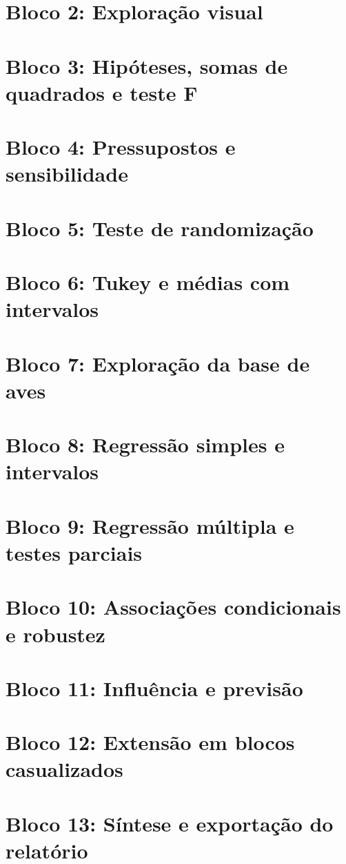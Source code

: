 \section{Bloco 2: Exploração visual}
\label{cod:bloco2}
\section{Bloco 3: Hipóteses, somas de quadrados e teste F}
\label{cod:bloco3}
\section{Bloco 4: Pressupostos e sensibilidade}
\label{cod:bloco4}
\section{Bloco 5: Teste de randomização}
\label{cod:bloco5}
\section{Bloco 6: Tukey e médias com intervalos}
\label{cod:bloco6}
\section{Bloco 7: Exploração da base de aves}
\label{cod:bloco7}
\section{Bloco 8: Regressão simples e intervalos}
\label{cod:bloco8}
\section{Bloco 9: Regressão múltipla e testes parciais}
\label{cod:bloco9}
\section{Bloco 10: Associações condicionais e robustez}
\label{cod:bloco10}
\section{Bloco 11: Influência e previsão}
\label{cod:bloco11}
\section{Bloco 12: Extensão em blocos casualizados}
\label{cod:bloco12}
\section{Bloco 13: Síntese e exportação do relatório}
\label{cod:bloco13}
